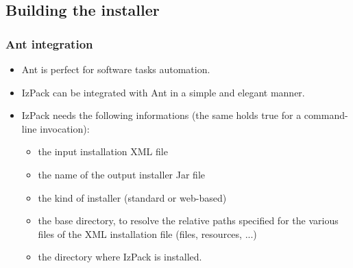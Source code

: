 \documentclass[compress,10pt]{beamer}
\begin{document}
\subsection{Building the installer}

\begin{frame}

\frametitle{Ant integration}

\begin{itemize}

  \item Ant is perfect for software tasks automation.

  \item IzPack can be integrated with Ant in a simple and elegant manner.

  \item IzPack needs the following informations (the same holds true for a
  command-line invocation):
    \begin{itemize}
      \item the input installation XML file

      \item the name of the output installer Jar file

      \item the kind of installer (standard or web-based)

      \item the base directory, to resolve the relative paths specified for the
      various files of the XML installation file (files, resources, ...)

      \item the directory where IzPack is installed.
    \end{itemize}

\end{itemize}

\end{frame}

\end{document}
